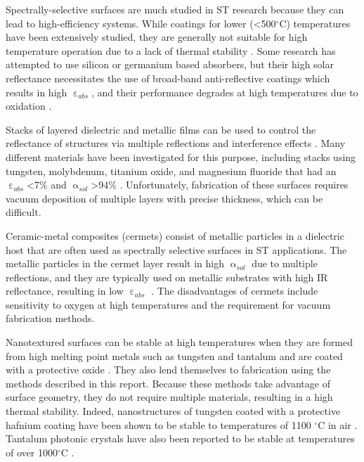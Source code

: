 \documentclass[review]{elsarticle}
\begin{document}
Spectrally-selective surfaces are much studied in ST research 
because they can lead to high-efficiency systems.  While coatings for lower (\textless500$^\circ$C) temperatures have been extensively studied, they are generally not suitable for high temperature operation due to a lack of thermal stability \cite{A1}.  Some research has attempted to use silicon or germanium based absorbers, but their high solar reflectance necessitates the use of broad-band anti-reflective coatings which results in high $\upepsilon_{abs}$, and their performance degrades at high temperatures due to oxidation \cite{A2}. 

Stacks of layered dielectric and metallic films can be used to control the reflectance of structures via multiple reflections and interference effects \cite{A3}.  Many different materials have been investigated for this purpose, including stacks using tungsten, molybdenum, titanium oxide, and magnesium fluoride that had an $\upepsilon_{abs}$\textless7\% and $\upalpha_{sol}$\textgreater94\% \cite{paper1_ref7,stacks2, A2}.  Unfortunately, fabrication of these surfaces requires vacuum deposition of multiple layers with precise thickness, which can be difficult.

Ceramic-metal composites (cermets) consist of metallic particles in a dielectric host that are often used as spectrally selective surfaces in ST applications.  The metallic particles in the cermet layer result in high $\upalpha_{sol}$ due to multiple reflections, and they are typically used on metallic substrates with high IR reflectance, resulting in low $\upepsilon_{abs}$ \cite{A2,A4,A5,A6,A7,A8,A9,A10}.  The disadvantages of cermets include sensitivity to oxygen at high temperatures and the requirement for vacuum fabrication methods.

Nanotextured surfaces can be stable at high temperatures when they are 
formed from high melting point metals such as tungsten and tantalum and are coated with a protective oxide \cite{paper1_ref5}.  They also lend themselves to fabrication using the methods described in this report.  Because these methods take advantage of surface geometry, they do not require multiple materials, resulting in a high thermal stability.  Indeed, nanostructures of tungsten coated with a protective hafnium coating have been shown to be stable to temperatures of 1100 $^\circ$C in air \cite{paper1_ref5,Therm_stabil_W_microstructures}.  Tantalum photonic crystals have also been reported to be stable at temperatures of over 1000$^\circ$C \cite{photonic_crystal_rev}.
\end{document}
